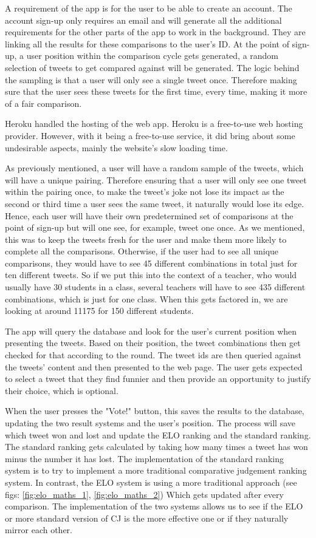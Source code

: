 	A requirement of the app is for the user to be able to create an account. The account sign-up only requires an email and will generate all the additional requirements for the other parts of the app to work in the background. They are linking all the results for these comparisons to the user's ID. At the point of sign-up, a user position within the comparison cycle gets generated, a random selection of tweets to get compared against will be generated. The logic behind the sampling is that a user will only see a single tweet once. Therefore making sure that the user sees these tweets for the first time, every time, making it more of a fair comparison.
	
	Heroku handled the hosting of the web app. Heroku is a free-to-use web hosting provider. However, with it being a free-to-use service, it did bring about some undesirable aspects, mainly the website's slow loading time.
	
	As previously mentioned, a user will have a random sample of the tweets, which will have a unique pairing. Therefore ensuring that a user will only see one tweet within the pairing once, to make the tweet's joke not lose its impact as the second or third time a user sees the same tweet, it naturally would lose its edge. Hence, each user will have their own predetermined set of comparisons at the point of sign-up but will one see, for example, tweet one once. As we mentioned, this was to keep the tweets fresh for the user and make them more likely to complete all the comparisons. Otherwise, if the user had to see all unique comparisons, they would have to see 45 different combinations in total just for ten different tweets. So if we put this into the context of a teacher, who would usually have 30 students in a class, several teachers will have to see 435 different combinations, which is just for one class. When this gets factored in, we are looking at around 11175 for 150 different students.
	
	The app will query the database and look for the user's current position when presenting the tweets. Based on their position, the tweet combinations then get checked for that according to the round. The tweet ids are then queried against the tweets' content and then presented to the web page. The user gets expected to select a tweet that they find funnier and then provide an opportunity to justify their choice, which is optional.   
	
	When the user presses the "Vote!" button, this saves the results to the database, updating the two result systems and the user's position. The process will save which tweet won and lost and update the ELO ranking and the standard ranking. The standard ranking gets calculated by taking how many times a tweet has won minus the number it has lost. The implementation of the standard ranking system is to try to implement a more traditional comparative judgement ranking system. In contrast, the ELO system is using a more traditional approach (see figs: \ref{fig:elo_maths_1}, \ref{fig:elo_maths_2}) Which gets updated after every comparison. The implementation of the two systems allows us to see if the ELO or more standard version of CJ is the more effective one or if they naturally mirror each other.
	

